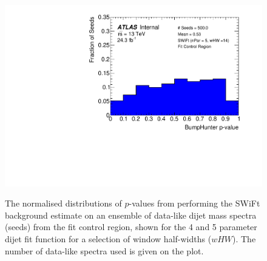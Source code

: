 \begin{figure}[!b]
 {                                                    
  \includegraphics[width=0.48\linewidth, angle=0]{figs/Dibjet/LowMass/FitStudy_min566/pVal_bumpHunter_corrFitCR_5para_low14_high14.pdf}
}                                                                                              
\caption[The normalised distributions of \bh{} \mbox{$p$-value}s from performing the SWiFt background estimate on an ensemble of
          data-like dijet mass spectra from the \lm{} fit control region.]
        {\label{fig:bumpH_spuriousSignal}
          The normalised distributions of \bh{} \mbox{$p$-value}s from performing the SWiFt background estimate on an ensemble of
          data-like dijet mass spectra (seeds) from the \lm{} fit control region,
          shown for the 4 and 5 parameter dijet fit function for a selection of window half-widths ($wHW$). 
          The number of data-like spectra used is given on the plot.
}
\end{figure}

